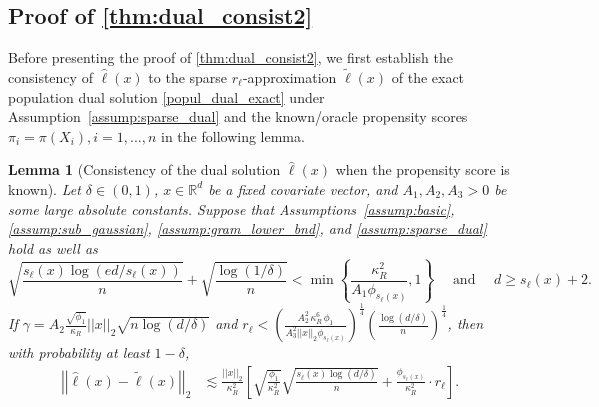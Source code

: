 \documentclass[ejsv2,noshowframe]{imsart}
\theoremstyle{plain}
\newtheorem{lemma}[theorem]{Lemma}
\theoremstyle{definition}
\theoremstyle{remark}
\newcommand{\norm}[1]{\left|\left| #1 \right|\right|}
\renewcommand{\hat}{\widehat}
\renewcommand{\tilde}{\widetilde}
\begin{document}
\subsection{Proof of \autoref{thm:dual_consist2}}
\label{subapp:proof_consist_dual}

Before presenting the proof of \autoref{thm:dual_consist2}, we first establish the consistency of $\hat{\ell}(x)$ to the sparse $r_{\ell}$-approximation $\tilde{\ell}(x)$ of the exact population dual solution \eqref{popul_dual_exact} under Assumption~\ref{assump:sparse_dual} and the known/oracle propensity scores $\pi_i=\pi(X_i), i=1,...,n$ in the following lemma. 

\begin{lemma}[Consistency of the dual solution $\hat{\ell}(x)$ when the propensity score is known]
	\label{lem:dual_consist}
	Let $\delta \in (0,1)$,  $x\in \mathbb{R}^d$ be a fixed covariate vector, and $A_1,A_2,A_3>0$ be some large absolute constants. Suppose that Assumptions~\ref{assump:basic}, \ref{assump:sub_gaussian}, \ref{assump:gram_lower_bnd}, and \ref{assump:sparse_dual} hold as well as
	$$\sqrt{\frac{s_{\ell}(x)\log(ed/s_{\ell}(x))}{n}} + \sqrt{\frac{\log(1/\delta)}{n}} < \min\left\{\frac{\kappa_R^2}{A_1\phi_{s_{\ell}(x)}}, 1 \right\} \quad \text{ and } \quad d\geq s_{\ell}(x)+2.$$
	If $\gamma = A_2 \frac{\sqrt{\phi_1}}{\kappa_R}\norm{x}_2 \sqrt{n\log(d/\delta)}$ and $r_{\ell} < \left(\frac{A_2^2 \,\kappa_R^6\, \phi_1}{A_3^2\norm{x}_2 \phi_{s_{\ell}(x)}}\right)^{\frac{1}{4}} \left(\frac{\log(d/\delta)}{n}\right)^{\frac{1}{4}}$, then with probability at least $1-\delta$,
	\begin{align*}
		\norm{\hat{\ell}(x)  - \tilde{\ell}(x)}_2 &\lesssim \frac{\norm{x}_2}{\kappa_R^2}\left[\sqrt{\frac{\phi_1}{\kappa_R^2}} \sqrt{\frac{s_{\ell}(x) \log(d/\delta)}{n}} + \frac{\phi_{s_{\ell}(x)}}{\kappa_R^2} \cdot r_{\ell} \right].
	\end{align*}
\end{lemma}
\end{document}
